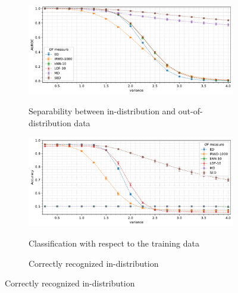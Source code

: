 \begin{figure}[t]
    \centering
    \begin{subfigure}[b]{0.9\textwidth}
        \centering
        \caption{\small Separability between in-distribution and out-of-distribution data}
        \includegraphics[width=\textwidth]{images/variances/g_var/trend-variances-auroc(variance)-n_varied_0.20-distance_16-outliers_varied_False-model_ED,IRWD-1000,kNN-10,LOF-10,MD,SED-aggregated.pdf}
        \label{fig:variance-auroc}
    \end{subfigure}
    \begin{subfigure}[b]{0.9\textwidth}
        \centering
        \caption{\small Classification with respect to the training data}
        \includegraphics[width=\textwidth]{images/variances/g_var/trend-variances-accuracy_95(variance)-n_varied_0.20-distance_16-outliers_varied_False-model_ED,IRWD-1000,kNN-10,LOF-10,MD,SED-aggregated.pdf}
        \label{fig:variance-accuracy}
    \end{subfigure}
    \begin{subfigure}[b]{0.495\textwidth}
        \centering
        \caption{\small Correctly recognized in-distribution}

\end{subfigure}
\end{figure}
